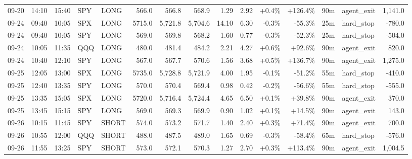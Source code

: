 \documentclass[11pt,a4paper,twoside]{article}
\begin{document}
\begin{landscape}
\begin{center}
\begin{longtable}{>{\color{txtmain}}l l l l l r r r r r r r r >{\color{txtmain}}l r}
09-20 & 14:10 & 15:40 & SPY & LONG & 566.0 & 566.8 & 568.9 & 1.29 & 2.92 & \textcolor{wingreen}{+0.4\%} & \textcolor{wingreen}{+126.4\%} & 90m & agent\_exit & \textcolor{wingreen}{1,141.0} \\
09-24 & 09:40 & 10:05 & SPX & LONG & 5715.0 & 5,721.8 & 5,704.6 & 14.10 & 6.30 & \textcolor{lossred}{-0.3\%} & \textcolor{lossred}{-55.3\%} & 25m & hard\_stop & \textcolor{lossred}{-780.0} \\
09-24 & 09:40 & 10:05 & SPY & LONG & 569.0 & 569.8 & 568.2 & 1.60 & 0.77 & \textcolor{lossred}{-0.3\%} & \textcolor{lossred}{-52.3\%} & 25m & hard\_stop & \textcolor{lossred}{-504.0} \\
09-24 & 10:05 & 11:35 & QQQ & LONG & 480.0 & 481.4 & 484.2 & 2.21 & 4.27 & \textcolor{wingreen}{+0.6\%} & \textcolor{wingreen}{+92.6\%} & 90m & agent\_exit & \textcolor{wingreen}{820.0} \\
09-24 & 10:40 & 12:10 & SPY & LONG & 567.0 & 567.7 & 570.6 & 1.56 & 3.68 & \textcolor{wingreen}{+0.5\%} & \textcolor{wingreen}{+136.7\%} & 90m & agent\_exit & \textcolor{wingreen}{1,275.0} \\
09-25 & 12:05 & 13:00 & SPX & LONG & 5735.0 & 5,728.8 & 5,721.9 & 4.00 & 1.95 & \textcolor{lossred}{-0.1\%} & \textcolor{lossred}{-51.2\%} & 55m & hard\_stop & \textcolor{lossred}{-410.0} \\
09-25 & 12:40 & 13:35 & SPY & LONG & 570.0 & 570.4 & 569.4 & 0.98 & 0.42 & \textcolor{lossred}{-0.2\%} & \textcolor{lossred}{-56.6\%} & 55m & hard\_stop & \textcolor{lossred}{-555.0} \\
09-25 & 13:35 & 15:05 & SPX & LONG & 5720.0 & 5,716.4 & 5,724.4 & 4.65 & 6.50 & \textcolor{wingreen}{+0.1\%} & \textcolor{wingreen}{+39.8\%} & 90m & agent\_exit & \textcolor{wingreen}{370.0} \\
09-25 & 13:45 & 15:15 & SPY & LONG & 569.0 & 569.3 & 569.9 & 0.90 & 1.02 & \textcolor{wingreen}{+0.1\%} & \textcolor{wingreen}{+14.5\%} & 90m & agent\_exit & \textcolor{wingreen}{143.0} \\
09-26 & 10:15 & 11:45 & SPY & SHORT & 574.0 & 573.2 & 571.7 & 1.40 & 2.40 & \textcolor{wingreen}{+0.3\%} & \textcolor{wingreen}{+71.4\%} & 90m & agent\_exit & \textcolor{wingreen}{700.0} \\
09-26 & 10:55 & 12:00 & QQQ & SHORT & 488.0 & 487.5 & 489.0 & 1.65 & 0.69 & \textcolor{lossred}{-0.3\%} & \textcolor{lossred}{-58.4\%} & 65m & hard\_stop & \textcolor{lossred}{-576.0} \\
09-26 & 11:55 & 13:25 & SPY & SHORT & 573.0 & 572.1 & 570.3 & 1.27 & 2.70 & \textcolor{wingreen}{+0.3\%} & \textcolor{wingreen}{+113.4\%} & 90m & agent\_exit & \textcolor{wingreen}{1,004.5} \\

\end{longtable}
\end{center}
\end{landscape}
\end{document}
